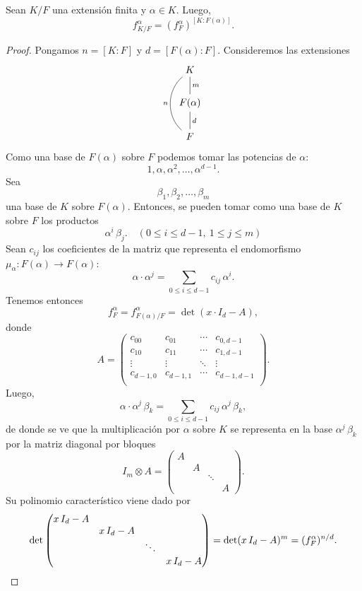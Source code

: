 \begin{proposicion}
  Sean $K/F$ una extensión finita y $\alpha\in K$. Luego,
  $$f^\alpha_{K/F} = (f^\alpha_F)^{[K : F (\alpha)]}.$$

  \begin{proof}
    Pongamos $n = [K : F]$ y $d = [F (\alpha) : F]$. Consideremos las
    extensiones
    \[ \begin{tikzcd}
      K\ar[-]{d}{m}\ar[bend right=50,-]{dd}[swap]{n} \\
      F (\alpha)\ar[-]{d}{d} \\
      F
    \end{tikzcd} \]
    Como una base de $F (\alpha)$ sobre $F$ podemos tomar las potencias de
    $\alpha$:
    $$1, \alpha, \alpha^2, \ldots, \alpha^{d-1}.$$
    Sea
    $$\beta_1, \beta_2, \ldots, \beta_m$$
    una base de $K$ sobre $F (\alpha)$. Entonces, se pueden tomar como una base
    de $K$ sobre $F$ los productos
    $$\alpha^i\,\beta_j. \quad (0 \le i \le d-1, ~ 1 \le j \le m)$$
    Sean $c_{ij}$ los coeficientes de la matriz que representa el endomorfismo
    $\mu_\alpha\colon F (\alpha) \to F (\alpha)$:
    $$\alpha\cdot \alpha^j = \sum_{0 \le i \le d-1} c_{ij}\,\alpha^i.$$
    Tenemos entonces
    $$f^\alpha_F = f^\alpha_{F(\alpha)/F} = \det (x\cdot I_d - A),$$
    donde
    \[ A = \begin{pmatrix}
      c_{00} & c_{01} & \cdots & c_{0,d-1} \\
      c_{10} & c_{11} & \cdots & c_{1,d-1} \\
      \vdots & \vdots & \ddots & \vdots \\
      c_{d-1,0} & c_{d-1,1} & \cdots & c_{d-1,d-1} \\
    \end{pmatrix}. \]
    Luego,
    $$\alpha\cdot \alpha^j\,\beta_k = \sum_{0 \le i \le d-1} c_{ij}\,\alpha^j\,\beta_k,$$
    de donde se ve que la multiplicación por $\alpha$ sobre $K$ se representa en
    la base $\alpha^j\,\beta_k$ por la matriz diagonal por bloques
    \[ I_m\otimes A = \begin{pmatrix}
      A \\
      & A \\
      & & \ddots \\
      & & & A
    \end{pmatrix}. \]
    Su polinomio característico viene dado por
    \[ \det \begin{pmatrix}
      x \, I_d - A \\
      & x \, I_d - A \\
      & & \ddots \\
      & & & x \, I_d - A
    \end{pmatrix} = \det (x \, I_d - A)^m = (f^\alpha_F)^{n/d}. \qedhere \]
  \end{proof}
\end{proposicion}

